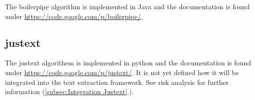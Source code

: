 The boilerpipe algorithm is implemented in Java and the documentation is found under
\url{https://code.google.com/p/boilerpipe/}.

\subsection{justext}

The justext algorithem is implemented in python and the documentation is found under \url{https://code.google.com/p/justext/}. It is not yet defined how it will be integrated into the text extraction framework. See risk analysis for further information (\ref{subsec:Integration Justext}.).